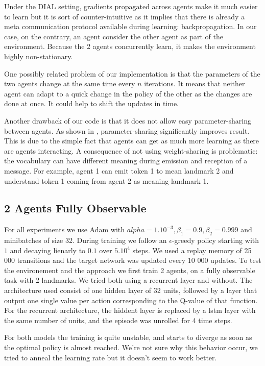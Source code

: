 \documentclass{article} %
\begin{document}
Under the DIAL setting, gradients propagated across agents make it much easier to learn but it is sort of counter-intuitive as it implies that there is already a meta communication protocol available during learning: backpropagation. In our case, on the contrary, an agent consider the other agent as part of the environment. Because the 2 agents concurrently learn, it makes the environment highly non-stationary.

One possibly related problem of our implementation is that the parameters of the two agents change at the same time every $n$ iterations. It means that neither agent can adapt to a quick change in the policy of the other as the changes are done at once. It could help to shift the updates in time.

Another drawback of our code is that it does not allow easy parameter-sharing between agents. As shown in \cite{foerster2016learning}, parameter-sharing significantly improves result. This is due to the simple fact that agents can get as much more learning as there are agents interacting. A consequence of not using weight-sharing is problematic: the vocabulary can have different meaning during emission and reception of a message. For example, agent 1 can emit token 1 to mean landmark 2 and understand token 1 coming from agent 2 as meaning landmark 1.

\subsection{2 Agents Fully Observable}
For all experiments we use Adam \cite{kingma2014adam} with $alpha=1.10^{-3}, \beta_1=0.9, \beta_2=0.999$ and minibatches of size 32. During training we follow an $\epsilon$-greedy policy starting with $1$ and decaying lienarly to $0.1$ over $5.10^4$ steps. We used a replay memory of 25 000 transitions and the target network was updated every 10 000 updates.
To test the environement and the approach we first train 2 agents, on a fully observable task with 2 landmarks.
We tried both using a recurrent layer and without. The architecture used  consist of one hidden layer of 32 units, followed by a layer that output one single value per action corresponding to the Q-value of that function. For the recurrent architecture, the hiddent layer is replaced by a lstm layer with the same number of units, and the episode was unrolled for 4 time steps.

For both models the training is quite unstable, and starts to diverge as soon as the optimal policy is almost reached. We're not sure why this behavior occur, we tried to anneal the learning rate but it doesn't seem to work better.
\end{document}
